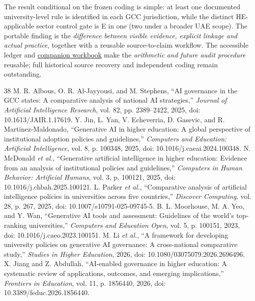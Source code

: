 \documentclass[conference,letterpaper]{IEEEtran}
\begin{document}
The result conditional on the frozen coding is simple: at least one documented university-level rule is identified in each GCC jurisdiction, while the distinct HE-applicable sector control gate is E in one (two under a broader UAE scope). The portable finding is the \emph{difference between visible evidence, explicit linkage and actual practice}, together with a reusable source-to-claim workflow. The accessible ledger and \href{https://github.com/shaikhamalkawi-ux/From-AI-Strategy-to-University-Rules-in-the-GCC/blob/main/ICAMAC2026_Paper90_R5_57/resources/ICAMAC_Paper90_R5_Reusable_Audit_Workbook.xlsx}{companion workbook} make the \emph{arithmetic and future audit procedure} reusable; full historical source recovery and independent coding remain outstanding.

\begin{thebibliography}{38}\footnotesize
{} M. R. Albous, O. R. Al-Jayyousi, and M. Stephens, ``AI governance in the GCC states: A comparative analysis of national AI strategies,'' \emph{Journal of Artificial Intelligence Research}, vol. 82, pp. 2389--2422, 2025, doi: 10.1613/JAIR.1.17619.
 Y. Jin, L. Yan, V. Echeverria, D. Gasevic, and R. Martinez-Maldonado, ``Generative AI in higher education: A global perspective of institutional adoption policies and guidelines,'' \emph{Computers and Education: Artificial Intelligence}, vol. 8, p. 100348, 2025, doi: 10.1016/j.caeai.2024.100348.
 N. McDonald \emph{et al.}, ``Generative artificial intelligence in higher education: Evidence from an analysis of institutional policies and guidelines,'' \emph{Computers in Human Behavior: Artificial Humans}, vol. 3, p. 100121, 2025, doi: 10.1016/j.chbah.2025.100121.
 L. Parker \emph{et al.}, ``Comparative analysis of artificial intelligence policies in universities across five countries,'' \emph{Discover Computing}, vol. 28, p. 267, 2025, doi: 10.1007/s10791-025-09745-5.
 B. L. Moorhouse, M. A. Yeo, and Y. Wan, ``Generative AI tools and assessment: Guidelines of the world's top-ranking universities,'' \emph{Computers and Education Open}, vol. 5, p. 100151, 2023, doi: 10.1016/j.caeo.2023.100151.
 M. Li \emph{et al.}, ``A framework for developing university policies on generative AI governance: A cross-national comparative study,'' \emph{Studies in Higher Education}, 2026, doi: 10.1080/03075079.2026.2696496.
 X. Jiang and Z. Abdullah, ``AI-enabled governance in higher education: A systematic review of applications, outcomes, and emerging implications,'' \emph{Frontiers in Education}, vol. 11, p. 1856440, 2026, doi: 10.3389/feduc.2026.1856440.

\end{thebibliography}
\end{document}
